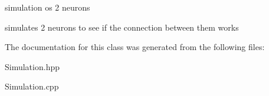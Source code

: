 simulation os 2 neurons 

simulates 2 neurons to see if the connection between them works 

The documentation for this class was generated from the following files\-:\begin{DoxyCompactItemize}
\item 
Simulation.\-hpp\item 
Simulation.\-cpp\end{DoxyCompactItemize}

